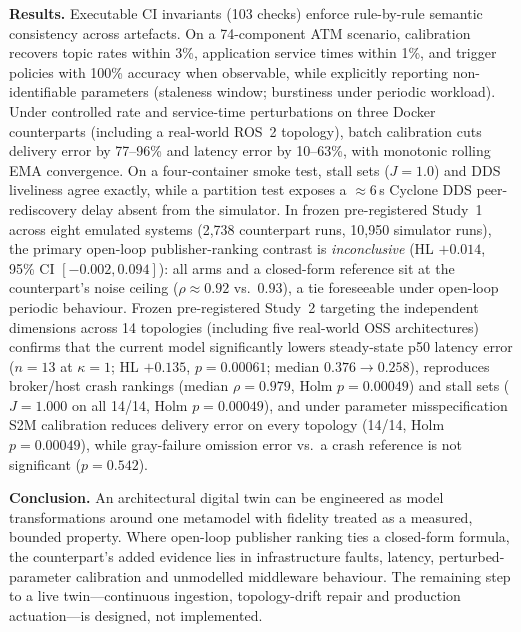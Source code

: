 \textbf{Results.} Executable CI invariants (103 checks) enforce rule-by-rule semantic consistency across artefacts. On a 74-component ATM scenario, calibration recovers topic rates within 3\%, application service times within 1\%, and trigger policies with 100\% accuracy when observable, while explicitly reporting non-identifiable parameters (staleness window; burstiness under periodic workload). Under controlled rate and service-time perturbations on three Docker counterparts (including a real-world ROS~2 topology), batch calibration cuts delivery error by 77--96\% and latency error by 10--63\%, with monotonic rolling EMA convergence. On a four-container smoke test, stall sets ($J = 1.0$) and DDS liveliness agree exactly, while a partition test exposes a $\approx 6$\,s Cyclone DDS peer-rediscovery delay absent from the simulator. In frozen pre-registered Study~1 across eight emulated systems (2,738 counterpart runs, 10,950 simulator runs), the primary open-loop publisher-ranking contrast is \emph{inconclusive} (HL $+0.014$, 95\% CI $[-0.002, 0.094]$): all arms and a closed-form reference sit at the counterpart's noise ceiling ($\rho \approx 0.92$ vs.\ $0.93$), a tie foreseeable under open-loop periodic behaviour. Frozen pre-registered Study~2 targeting the independent dimensions across 14 topologies (including five real-world OSS architectures) confirms that the current model significantly lowers steady-state p50 latency error ($n = 13$ at $\kappa = 1$; HL $+0.135$, $p = 0.00061$; median $0.376 \to 0.258$), reproduces broker/host crash rankings (median $\rho = 0.979$, Holm $p = 0.00049$) and stall sets ($J = 1.000$ on all 14/14, Holm $p = 0.00049$), and under parameter misspecification S2M calibration reduces delivery error on every topology (14/14, Holm $p = 0.00049$), while gray-failure omission error vs.\ a crash reference is not significant ($p = 0.542$).

\textbf{Conclusion.} An architectural digital twin can be engineered as model transformations around one metamodel with fidelity treated as a measured, bounded property. Where open-loop publisher ranking ties a closed-form formula, the counterpart's added evidence lies in infrastructure faults, latency, perturbed-parameter calibration and unmodelled middleware behaviour. The remaining step to a live twin---continuous ingestion, topology-drift repair and production actuation---is designed, not implemented.
